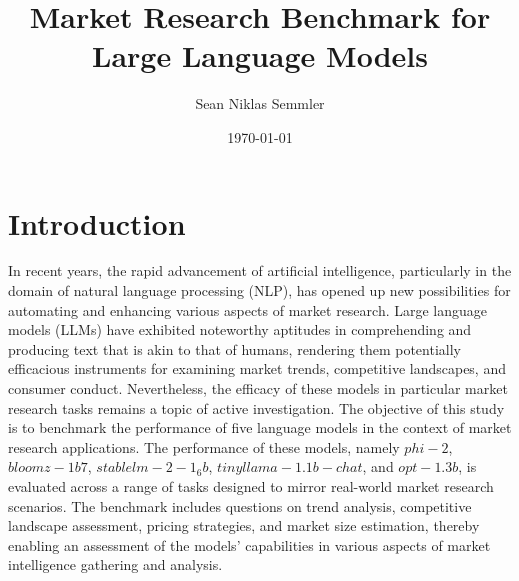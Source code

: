 \documentclass[12pt,a4paper]{article}
\title{Market Research Benchmark for Large Language Models}
\author{Sean Niklas Semmler}
\date{\today}
\begin{document}
	
	\maketitle
	
	\tableofcontents
	
	\section{Introduction}
	In recent years, the rapid advancement of artificial intelligence, particularly in the domain of natural language processing (NLP), has opened up new possibilities for automating and enhancing various aspects of market research. Large language models (LLMs) have exhibited noteworthy aptitudes in comprehending and producing text that is akin to that of humans, rendering them potentially efficacious instruments for examining market trends, competitive landscapes, and consumer conduct. Nevertheless, the efficacy of these models in particular market research tasks remains a topic of active investigation.
	The objective of this study is to benchmark the performance of five language models in the context of market research applications. The performance of these models, namely $phi-2$, $bloomz-1b7$, $stablelm-2-1_6b$, $tinyllama-1.1b-chat$, and $opt-1.3b$, is evaluated across a range of tasks designed to mirror real-world market research scenarios. The benchmark includes questions on trend analysis, competitive landscape assessment, pricing strategies, and market size estimation, thereby enabling an assessment of the models' capabilities in various aspects of market intelligence gathering and analysis.
\end{document}
